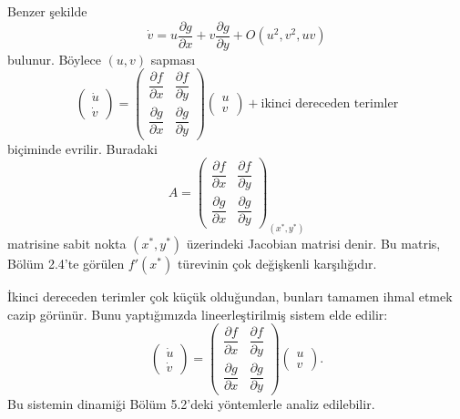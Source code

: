 \begin{justify}
Benzer şekilde
\begin{equation}
\dot{v}=u\frac{\partial g}{\partial x}+v\frac{\partial g}{\partial y}+O(u^2,v^2,uv)
\end{equation}
bulunur. Böylece $(u,v)$ sapması
\begin{equation}
\begin{pmatrix}\dot{u}\\ \dot{v}\end{pmatrix}
=
\begin{pmatrix}
\dfrac{\partial f}{\partial x} & \dfrac{\partial f}{\partial y}\\[0.3cm]
\dfrac{\partial g}{\partial x} & \dfrac{\partial g}{\partial y}
\end{pmatrix}
\begin{pmatrix}u\\ v\end{pmatrix}
+ \text{ikinci dereceden terimler}
\end{equation}
biçiminde evrilir. Buradaki
\begin{equation}
A=\begin{pmatrix}
\dfrac{\partial f}{\partial x} & \dfrac{\partial f}{\partial y}\\[0.3cm]
\dfrac{\partial g}{\partial x} & \dfrac{\partial g}{\partial y}
\end{pmatrix}_{(x^{*},y^{*})}
\end{equation}
matrisine sabit nokta $(x^{*},y^{*})$ üzerindeki Jacobian matrisi denir. Bu matris, Bölüm 2.4'te görülen $f'(x^{*})$ türevinin çok değişkenli karşılığıdır.

İkinci dereceden terimler çok küçük olduğundan, bunları tamamen ihmal etmek cazip görünür. Bunu yaptığımızda lineerleştirilmiş sistem elde edilir:
\begin{equation}
\begin{pmatrix}\dot{u}\\ \dot{v}\end{pmatrix}
=
\begin{pmatrix}
\dfrac{\partial f}{\partial x} & \dfrac{\partial f}{\partial y}\\[0.3cm]
\dfrac{\partial g}{\partial x} & \dfrac{\partial g}{\partial y}
\end{pmatrix}
\begin{pmatrix}u\\ v\end{pmatrix}.
\end{equation}
Bu sistemin dinamiği Bölüm 5.2'deki yöntemlerle analiz edilebilir.
\end{justify}

